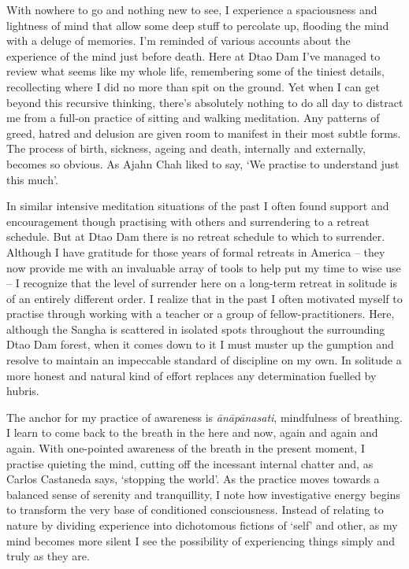With nowhere to go and nothing new to see, I experience a spaciousness
and lightness of mind that allow some deep stuff to percolate up, 
flooding the mind with a deluge of memories. I'm reminded of various
accounts about the experience of the mind just before death. Here at
Dtao Dam I've managed to review what seems like my whole life, 
remembering some of the tiniest details, recollecting where I did no
more than spit on the ground. Yet when I can get beyond this recursive
thinking, there's absolutely nothing to do all day to distract me from a
full-on practice of sitting and walking meditation. Any patterns of
greed, hatred and delusion are given room to manifest in their most
subtle forms. The process of birth, sickness, ageing and death, 
internally and externally, becomes so obvious. As Ajahn Chah liked to
say, `We practise to understand just this much'. 

In similar intensive meditation situations of the past I often found
support and encouragement though practising with others and surrendering
to a retreat schedule. But at Dtao Dam there is no retreat schedule to
which to surrender. Although I have gratitude for those years of formal
retreats in America -- they now provide me with an invaluable array of
tools to help put my time to wise use -- I recognize that the level of
surrender here on a long-term retreat in solitude is of an entirely
different order. I realize that in the past I often motivated myself to
practise through working with a teacher or a group of
fellow-practitioners. Here, although the Sangha is scattered in isolated
spots throughout the surrounding Dtao Dam forest, when it comes down to
it I must muster up the gumption and resolve to maintain an impeccable
standard of discipline on my own. In solitude a more honest and natural
kind of effort replaces any determination fuelled by hubris. 

The anchor for my practice of awareness is \emph{ānāpānasati}, 
mindfulness of breathing. I learn to come back to the breath in the here
and now, again and again and again. With one-pointed awareness of the
breath in the present moment, I practise quieting the mind, cutting off
the incessant internal chatter and, as Carlos Castaneda says, `stopping
the world'. As the practice moves towards a balanced sense of serenity
and tranquillity, I note how investigative energy begins to transform
the very base of conditioned consciousness. Instead of relating to
nature by dividing experience into dichotomous fictions of `self' and
other, as my mind becomes more silent I see the possibility of
experiencing things simply and truly as they are. 

